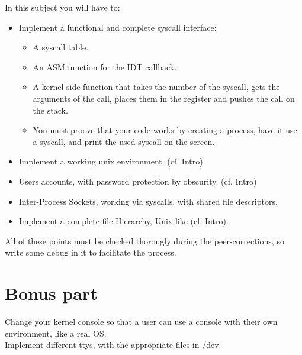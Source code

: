\documentclass{42-en}
\begin{document}
    In this subject you will have to:
    \begin{itemize}\itemsep1pt
        \item Implement a functional and complete syscall interface:
        \begin{itemize}\itemsep1pt
            \item A syscall table.
            \item An ASM function for the IDT callback.
            \item A kernel-side function that takes the number of the syscall,
            gets the arguments of the call, places them in the register and pushes
            the call on the stack.
            \item You must proove that your code works by creating a process,
            have it use a syscall, and print the used syscall on the screen.
        \end{itemize}
        \item Implement a working unix environment. (cf. Intro)
        \item Users accounts, with password protection by obscurity. (cf. Intro)
        \item Inter-Process Sockets, working via syscalls, with shared file
        descriptors.
        \item Implement a complete file Hierarchy, Unix-like (cf. Intro).
    \end{itemize}
    All of these points must be checked thorougly during the peer-corrections,
    so write some debug in it to facilitate the process.

\chapter{Bonus part}
    Change your kernel console so that a user can use a console with their own
    environment, like a real OS.\\
    Implement different ttys, with the appropriate files in /dev.

\end{document}
